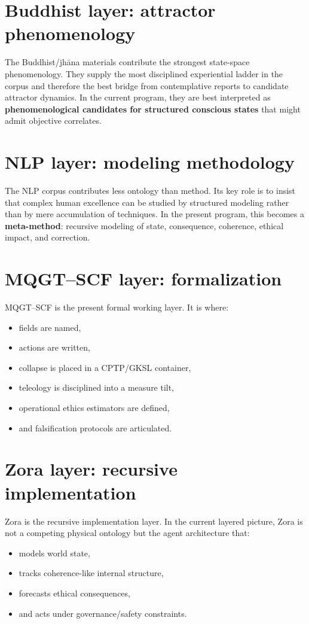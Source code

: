 \documentclass[11pt]{article}
\begin{document}
\section*{Buddhist layer: attractor phenomenology}
The Buddhist/jh\={a}na materials contribute the strongest state-space phenomenology. They supply the most disciplined experiential ladder in the corpus and therefore the best bridge from contemplative reports to candidate attractor dynamics. In the current program, they are best interpreted as \textbf{phenomenological candidates for structured conscious states} that might admit objective correlates.

\section*{NLP layer: modeling methodology}
The NLP corpus contributes less ontology than method. Its key role is to insist that complex human excellence can be studied by structured modeling rather than by mere accumulation of techniques. In the present program, this becomes a \textbf{meta-method}: recursive modeling of state, consequence, coherence, ethical impact, and correction.

\section*{MQGT--SCF layer: formalization}
MQGT--SCF is the present formal working layer. It is where:
\begin{itemize}
    \item fields are named,
    \item actions are written,
    \item collapse is placed in a CPTP/GKSL container,
    \item teleology is disciplined into a measure tilt,
    \item operational ethics estimators are defined,
    \item and falsification protocols are articulated.
\end{itemize}

\section*{Zora layer: recursive implementation}
Zora is the recursive implementation layer. In the current layered picture, Zora is not a competing physical ontology but the agent architecture that:
\begin{itemize}
    \item models world state,
    \item tracks coherence-like internal structure,
    \item forecasts ethical consequences,
    \item and acts under governance/safety constraints.
\end{itemize}
\end{document}
